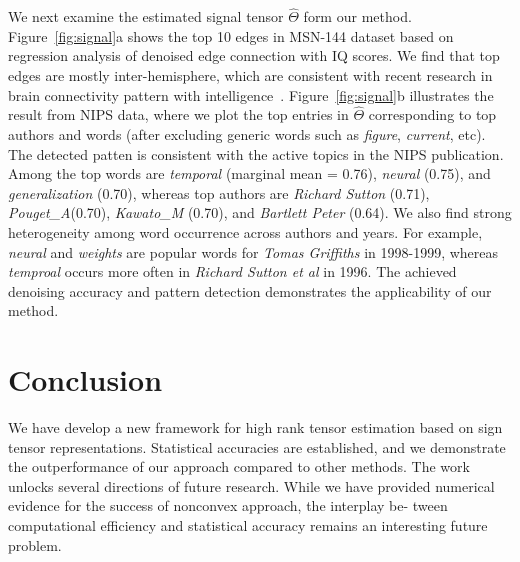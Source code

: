 \documentclass{article}
\theoremstyle{plain}
\theoremstyle{definition}
\begin{document}
We next examine the estimated signal tensor $\hat \Theta$ form our method. Figure~\ref{fig:signal}a shows the top 10 edges in MSN-144 dataset based on regression analysis of denoised edge connection with IQ scores. We find that top edges are mostly inter-hemisphere, which are consistent with recent research in brain connectivity pattern with intelligence~\cite{li2009brain,wang2017bayesian}. Figure~\ref{fig:signal}b illustrates the result from NIPS data, where we plot the top entries in $\hat \Theta$ corresponding to top authors and words (after excluding generic words such as \emph{figure}, \emph{current}, etc). The detected patten is consistent with the active topics in the NIPS publication. Among the top words are \emph{temporal} (marginal mean = 0.76), \emph{neural} (0.75), and \emph{generalization} (0.70), whereas top authors are \emph{Richard Sutton} (0.71), \emph{Pouget\_A}(0.70), \emph{Kawato\_M} (0.70), and \emph{Bartlett Peter} (0.64). We also find strong heterogeneity among word occurrence across authors and years. For example, \emph{neural} and \emph{weights} are popular words for \emph{Tomas Griffiths} in 1998-1999, whereas \emph{temproal} occurs more often in \emph{Richard Sutton et al} in 1996. The achieved denoising accuracy and pattern detection demonstrates the applicability of our method.

\section{Conclusion}
We have develop a new framework for high rank tensor estimation based on sign tensor representations. Statistical accuracies are established, and we demonstrate the outperformance of our approach compared to other methods. The work unlocks several directions of future research. While we have provided numerical evidence for the success of nonconvex approach, the interplay be- tween computational efficiency and statistical accuracy remains an interesting future problem. 




\appendix
\end{document}
